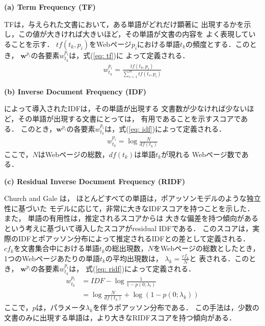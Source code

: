 \documentclass[japanese]{jnlp_1.4}
\begin{document}
\clearpage

\noindent
\textbf{(a) Term Frequency (TF)} 

TFは，与えられた文書において，ある単語がどれだけ顕著に
出現するかを示し，この値が大きければ大きいほど，その単語が文書の内容を
よく表現していることを示す．
$tf(t_{k}, p_{i})$をWebページ$p_{i}$における単語$t_{k}$の頻度とする．このとき，
$\boldsymbol{w}^{p_{i}}$の各要素$w_{t_{k}}^{p_{i}}$は，式(\ref{eq: tf})に
よって定義される．
\begin{eqnarray}
 w_{t_{k}}^{p_{i}}=\frac{tf(t_{k}, p_{i})}{\sum_{s=1}^{m}tf(t_{s}, p_{i})} \label{eq: tf}
\end{eqnarray} 

\noindent
\textbf{(b) Inverse Document Frequency (IDF)} 

\cite{Jones73} によって導入されたIDFは，その単語が出現する
文書数が少なければ少ないほど，その単語が出現する文書にとっては，
有用であることを示すスコアである．
このとき，$\boldsymbol{w}^{p_{i}}$の各要素$w_{t_{k}}^{p_{i}}$は，式(\ref{eq: idf})によって定義される．
\begin{eqnarray}
 w_{t_{k}}^{p_{i}}=\log\frac{N}{df(t_{k})} \label{eq: idf}
\end{eqnarray}
ここで，$N$はWebページの総数，$df(t_{k})$は単語$t_{k}$が現れる
Webページ数である．

\noindent
\textbf{(c) Residual Inverse Document Frequency (RIDF)}

Church and Gale \cite{Church95VLC,Church95JNLE} は，
ほとんどすべての単語は，ポアッソンモデルのような独立性に基づいた
モデルに応じて，非常に大きなIDFスコアを持つことを示した．また，
単語の有用性は，推定されるスコアからは
大きな偏差を持つ傾向があるという考えに基づいて導入したスコアがresidual IDFである．
このスコアは，実際のIDFとポアッソン分布によって推定されるIDFとの差として定義される．
$cf_{k}$を文書集合中における単語$t_{k}$の総出現数，$N$をWebページの総数としたとき，
1つのWebページあたりの単語$t_{k}$の平均出現数は，
$\lambda_{k}=\frac{cf_{k}}{N}$と
表される．このとき，
$\boldsymbol{w}^{p_{i}}$の各要素$w_{t_{k}}^{p_{i}}$は，
式(\ref{eq: ridf})によって定義される．
\begin{align}
 w_{t_{k}}^{p_{i}} &= IDF - \log\frac{1}{1-p(0;\lambda_{i})} \nonumber \\
               &= \log\frac{N}{df(t_{k})}+\log(1-p(0;\lambda_{k})) \label{eq: ridf}
\end{align}
ここで，$p$は，パラメータ$\lambda_{k}$を伴うポアッソン分布である．
この手法は，少数の文書のみに出現する単語は，より大きなRIDFスコアを持つ傾向がある．
\end{document}

